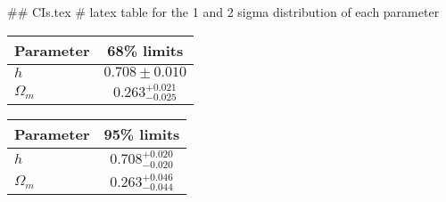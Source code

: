 ## CIs.tex
# latex table for the 1 and 2 sigma distribution of each parameter

\begin{tabular} { l  c}
 Parameter &  68\% limits\\
\hline
{\boldmath$h              $} & $0.708\pm 0.010            $\\
{\boldmath$\Omega_m       $} & $0.263^{+0.021}_{-0.025}   $\\
\hline
\end{tabular}

\begin{tabular} { l  c}
 Parameter &  95\% limits\\
\hline
{\boldmath$h              $} & $0.708^{+0.020}_{-0.020}   $\\
{\boldmath$\Omega_m       $} & $0.263^{+0.046}_{-0.044}   $\\
\hline
\end{tabular}
